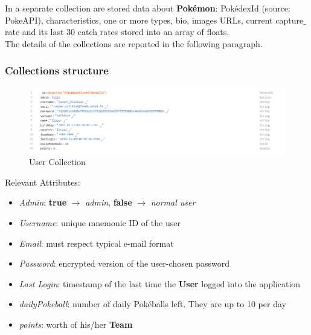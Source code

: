 In a separate collection are stored data about \textbf{Pokémon}: PokédexId (source: PokeAPI), characteristics, one or more types, bio, images URLs, current capture$\_$rate and its last 30 catch$\_$rates stored into an array of floats.\\

The details of the collections are reported in the following paragraph.

\subsubsection{Collections structure}
\begin{figure}[H]
	\centering
	\includegraphics[width=\textwidth]{img/user_collection.png}
	\caption{User Collection}
\end{figure}
Relevant Attributes:
\begin{itemize}
	\item \textit{Admin}: \textbf{true} $\rightarrow$ \textit{admin}, \textbf{false} $\rightarrow$ \textit{normal user}
	\item \textit{Username}: unique mnemonic ID of the user
	\item \textit{Email}: must respect typical e-mail format
	\item \textit{Password}: encrypted version of the user-chosen password
	\item \textit{Last Login}: timestamp of the last time the \textbf{User} logged into the application
	\item \textit{dailyPokeball}: number of daily Pokéballs left. They are up to 10 per day
	\item \textit{points}: worth of his/her \textbf{Team}
\end{itemize}

